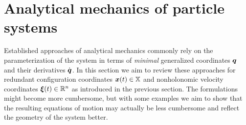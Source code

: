 \chapter{Analytical mechanics of particle systems}

Established approaches of analytical mechanics commonly rely on the parameterization of the system in terms of \textit{minimal} generalized coordinates $\boldsymbol{q}$ and their derivatives $\dot{\boldsymbol{q}}$.
In this section we aim to review these approaches for redundant configuration coordinates $\boldsymbol{x}(t) \in \mathbb{X}$ and nonholonomic velocity coordinates $\boldsymbol{\xi}(t)\in\mathbb{R}^n$ as introduced in the previous section.
The formulations might become more cumbersome, but with some examples we aim to show that the resulting equations of motion may actually be less cumbersome and reflect the geometry of the system better.


